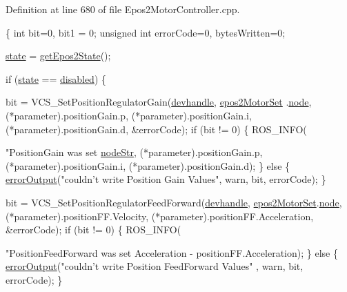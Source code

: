 Definition at line 680 of file Epos2\-Motor\-Controller.\-cpp.


\begin{DoxyCode}
\{
    \textcolor{keywordtype}{int} bit=0, bit1 = 0;
    \textcolor{keywordtype}{unsigned} \textcolor{keywordtype}{int} errorCode=0, bytesWritten=0;

    \hyperlink{classEpos2MotorController_a7194b8efd4f2fd5a4d64b10135c416e2}{state} = \hyperlink{classEpos2MotorController_ac6c31e0dc57485aa817431b22627fc70}{getEpos2State}();

    \textcolor{keywordflow}{if} (\hyperlink{classEpos2MotorController_a7194b8efd4f2fd5a4d64b10135c416e2}{state} == \hyperlink{classEpos2MotorController_ab5ec630dfbb90ad674e311187926060caf0eea74682d3d3f21bec6e5b376cf443}{disabled}) \{

        bit = VCS\_SetPositionRegulatorGain(\hyperlink{classEpos2MotorController_a40594faab444bcba221ab9d55d1162cd}{devhandle}, \hyperlink{classEpos2MotorController_a0856f5fdd71ffa3b84a536afa085bfb1}{epos2MotorSet}
      .\hyperlink{structEpos2MotorController_1_1epos2Settings_ab8f18d3df17e8de9ed5250a3e53292c6}{node}, (*parameter).positionGain.p, (*parameter).positionGain.i, 
      (*parameter).positionGain.d, &errorCode);
        \textcolor{keywordflow}{if} (bit != 0) \{
            ROS\_INFO(\textcolor{stringliteral}{"PositionGain was set %
      \hyperlink{classEpos2MotorController_aec7abbd4cd8e70e98f28cae457275e31}{nodeStr}, (*parameter).positionGain.p, (*parameter).positionGain.i, 
      (*parameter).positionGain.d);
        \} \textcolor{keywordflow}{else} \{
            \hyperlink{classEpos2MotorController_a64d5e3e3858597c111e60ba8b382a63b}{errorOutput}(\textcolor{stringliteral}{"couldn't write Position Gain Values"}, warn,
       bit, errorCode);
        \}

        bit = VCS\_SetPositionRegulatorFeedForward(\hyperlink{classEpos2MotorController_a40594faab444bcba221ab9d55d1162cd}{devhandle}, 
      \hyperlink{classEpos2MotorController_a0856f5fdd71ffa3b84a536afa085bfb1}{epos2MotorSet}.\hyperlink{structEpos2MotorController_1_1epos2Settings_ab8f18d3df17e8de9ed5250a3e53292c6}{node}, (*parameter).positionFF.Velocity, 
      (*parameter).positionFF.Acceleration, &errorCode);
        \textcolor{keywordflow}{if} (bit != 0) \{
            ROS\_INFO(\textcolor{stringliteral}{"PositionFeedForward was set %
       Acceleration - %
      positionFF.Acceleration);
        \} \textcolor{keywordflow}{else} \{
            \hyperlink{classEpos2MotorController_a64d5e3e3858597c111e60ba8b382a63b}{errorOutput}(\textcolor{stringliteral}{"couldn't write Position FeedForward Values"}
      , warn, bit, errorCode);
        \}

}}
\end{DoxyCode}

